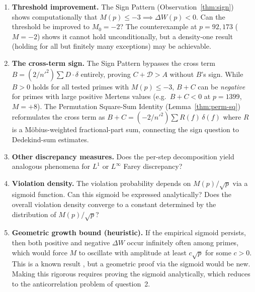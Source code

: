 \documentclass[11pt]{article}
\theoremstyle{definition}
\begin{document}

\begin{enumerate}
  \item \textbf{Threshold improvement.}
    The Sign Pattern (Observation~\ref{thm:sign}) shows computationally that
    $M(p) \le -3 \implies \Delta W(p) < 0$.
    Can the threshold be improved to $M_0 = -2$?
    The counterexample at $p = 92{,}173$ ($M = -2$) shows it
    cannot hold unconditionally, but a density-one result
    (holding for all but finitely many exceptions) may be achievable.

  \item \textbf{The cross-term sign.}
    The Sign Pattern bypasses the cross term $B = (2/n'^2)\sum D
    \cdot \delta$ entirely, proving $C + \mathcal{D} > A$ without
    $B$'s sign.  While $B > 0$ holds
    for all tested primes with $M(p) \le -3$,
    $B + C$ can be \emph{negative} for primes with large positive
    Mertens values (e.g.\ $B + C < 0$ at $p = 1399$, $M = +8$).
    The Permutation Square-Sum Identity
    (Lemma~\ref{thm:perm-sq}) reformulates the cross term as
    $B + C = (-2/{n'}^2)\sum R(f)\,\delta(f)$ where $R$ is a
    M\"obius-weighted fractional-part sum, connecting
    the sign question to Dedekind-sum estimates.

  \item \textbf{Other discrepancy measures.}  Does the per-step
    decomposition yield analogous phenomena for $L^1$ or $L^\infty$
    Farey discrepancy?

  \item \textbf{Violation density.}  The violation probability
    depends on $M(p)/\sqrt{p}$ via a sigmoid function.  Can this
    sigmoid be expressed analytically?  Does the overall violation
    density converge to a constant determined by the distribution
    of $M(p)/\sqrt{p}$?

  \item \textbf{Geometric growth bound (heuristic).}  If the
    empirical sigmoid persists, then both positive and negative
    $\Delta W$ occur infinitely often among primes, which would
    force $M$ to oscillate with amplitude at least
    $c\sqrt{p}$ for some $c > 0$.  This is a known result
    \cite{Ingham1942}, but a geometric proof via the sigmoid would
    be new.  Making this rigorous requires proving the
    sigmoid analytically, which reduces to the anticorrelation
    problem of question~2.

  
\end{enumerate}
\end{document}
